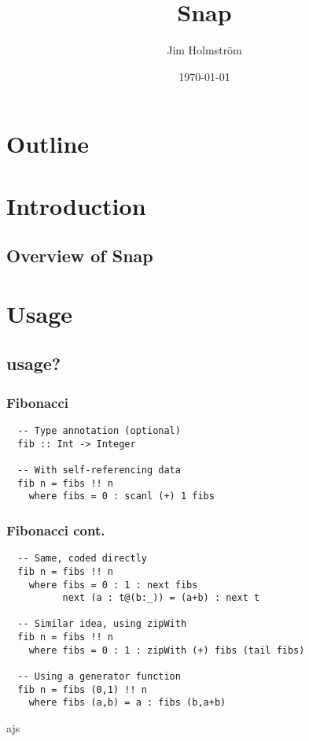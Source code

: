 \documentclass{beamer}
\title{Snap}
\author{Jim Holmstr\"{o}m}
\date{\today}
\begin{document}
\begin{frame}
  \titlepage
\end{frame}

\section*{Outline}
\begin{frame}
  \tableofcontents
\end{frame}

\section{Introduction}
\subsection{Overview of Snap}

\section{Usage}
\subsection{usage?}


\begin{frame}[fragile]{}
  \frametitle{Fibonacci}
  \begin{verbatim}
  -- Type annotation (optional)
  fib :: Int -> Integer

  -- With self-referencing data
  fib n = fibs !! n
    where fibs = 0 : scanl (+) 1 fibs
  \end{verbatim}
\end{frame}
\begin{frame}[fragile]{}
  \frametitle{Fibonacci cont.}
  \begin{verbatim}
  -- Same, coded directly
  fib n = fibs !! n
    where fibs = 0 : 1 : next fibs
          next (a : t@(b:_)) = (a+b) : next t

  -- Similar idea, using zipWith
  fib n = fibs !! n
    where fibs = 0 : 1 : zipWith (+) fibs (tail fibs)

  -- Using a generator function
  fib n = fibs (0,1) !! n
    where fibs (a,b) = a : fibs (b,a+b)
  \end{verbatim}
\end{frame}
\begin{frame}
    ajs
\end{frame}
\end{document}
